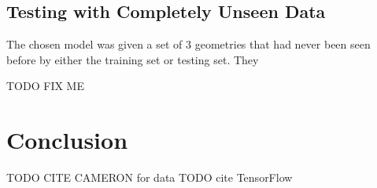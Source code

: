 \documentclass[lettersize,journal]{IEEEtran}
\begin{document}
\subsection{Testing with Completely Unseen Data}
The chosen model was given a set of 3 geometries that had never been seen before by either the training set or testing set. They 

TODO FIX ME 


\section{Conclusion}

TODO CITE CAMERON for data
TODO cite TensorFlow





\vfill
\end{document}
